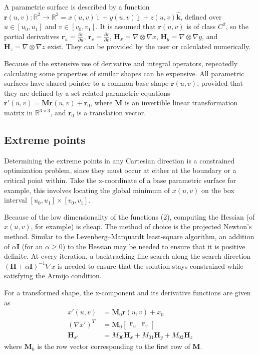 A parametric surface is described by a function $\bm{r}(u,v): \mathbb{R}^2 \rightarrow \mathbb{R}^3 = x(u,v)\bm{\hat{\imath}} + y(u,v)\bm{\hat{\jmath}} + z(u,v)\bm{\hat{k}}$, defined over $u \in [u_0, u_1]$ and $v \in [v_0, v_1]$.
It is assumed that $\bm{r}(u,v)$ is of class $C^2$, so the partial derivatives $\displaystyle \bm{r}_u = \frac{\partial r}{\partial u}$, $\displaystyle \bm{r}_v = \frac{\partial r}{\partial v}$,
$\bm{H}_x = \nabla \otimes \nabla x$, $\bm{H}_y = \nabla \otimes \nabla y$, and $\bm{H}_z = \nabla \otimes \nabla z$ exist. They can be provided by the user or calculated numerically.

Because of the extensive use of derivative and integral operators, repeatedly calculating some properties of similar shapes can be expensive. All parametric surfaces have shared pointer to a common base shape
$\bm{r}(u,v)$, provided that they are defined by a set related parametric equations $\bm{r}'(u,v) = \bm{M}\bm{r}(u,v) + \bm{r}_0$, where $\bm{M}$ is an invertible linear transformation matrix in $\mathbb{R}^{3\times3}$,
and $\bm{r}_0$ is a translation vector.

\subsection{Extreme points}
Determining the extreme points in any Cartesian direction is a constrained optimization problem, since they must occur at either at the boundary or a critical point within. Take the x-coordinate of a base parametric
surface for example, this involves locating the global minimum of $x(u,v)$ on the box interval $[u_0, u_1] \times [v_0, v_1]$.

Because of the low dimensionality of the functions (2), computing the Hessian (of $x(u,v)$, for example) is cheap. The method of choice is the projected Newton's method. Similar to the Levenberg–Marquardt least-square
algorithm, an addition of $\alpha \bm{I}$ (for an $\alpha \geq 0$) to the Hessian may be needed to ensure that it is positive definite. At every iteration, a backtracking line search along the search direction
$(\bm{H} + \alpha\bm{I})^{-1} \nabla x$ is needed to ensure that the solution stays constrained while satisfying the Armijo condition.

For a transformed shape, the x-component and its derivative functions are given as
\begin{align}
    x'(u,v) &= \bm{M}_0\bm{r}(u,v) + x_0 \\
    \left(\nabla x'\right)^T &= \bm{M}_0
    \begin{bmatrix}
        \bm{r}_u & \bm{r}_v
    \end{bmatrix}
    \\
    \bm{H}_{x'} &= M_{00}\bm{H}_x + M_{01}\bm{H}_y + M_{02}\bm{H}_z
\end{align}
where $\bm{M}_0$ is the row vector corresponding to the first row of $\bm{M}$.

